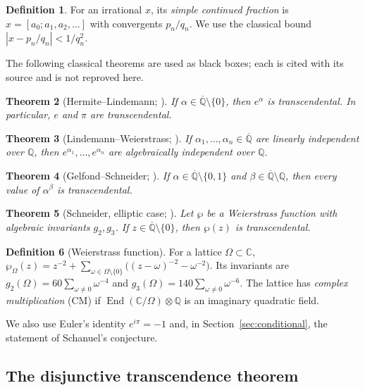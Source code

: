 \documentclass[11pt]{amsart}
\newtheorem{theorem}{Theorem}[section]
\theoremstyle{definition}
\newtheorem{definition}[theorem]{Definition}
\theoremstyle{remark}
\numberwithin{equation}{section}
\newcommand{\Q}{\mathbb{Q}}
\newcommand{\C}{\mathbb{C}}
\newcommand{\Qbar}{\overline{\mathbb{Q}}}
\newcommand{\ee}{e}
\begin{document}
\begin{definition}
For an irrational $x$, its \emph{simple continued fraction} is $x=[a_0;a_1,a_2,\dots]$ with convergents $p_n/q_n$. We use the classical bound $|x-p_n/q_n|<1/q_n^2$.
\end{definition}

The following classical theorems are used as black boxes; each is cited with its source and is not reproved here.

\begin{theorem}[Hermite--Lindemann; {\cite{Hermite1873,Lindemann1882}}]\label{thm:HL}
If $\alpha\in\Qbar\setminus\{0\}$, then $\ee^\alpha$ is transcendental. In particular, $\ee$ and $\pi$ are transcendental.
\end{theorem}

\begin{theorem}[Lindemann--Weierstrass; {\cite{Lindemann1882}}]\label{thm:LW}
If $\alpha_1,\dots,\alpha_n\in\Qbar$ are linearly independent over $\Q$, then $\ee^{\alpha_1},\dots,\ee^{\alpha_n}$ are algebraically independent over $\Q$.
\end{theorem}

\begin{theorem}[Gelfond--Schneider; {\cite{GS1934}}]\label{thm:GS}
If $\alpha\in\Qbar\setminus\{0,1\}$ and $\beta\in\Qbar\setminus\Q$, then every value of $\alpha^\beta$ is transcendental.
\end{theorem}

\begin{theorem}[Schneider, elliptic case; {\cite{Duke}}]\label{thm:schneider}
Let $\wp$ be a Weierstrass function with algebraic invariants $g_2,g_3$. If $z\in\Qbar\setminus\{0\}$, then $\wp(z)$ is transcendental.
\end{theorem}

\begin{definition}[Weierstrass function]
For a lattice $\Omega\subset\C$, $\wp_\Omega(z)=z^{-2}+\sum_{\omega\in\Omega\setminus\{0\}}\bigl((z-\omega)^{-2}-\omega^{-2}\bigr)$. Its invariants are $g_2(\Omega)=60\sum_{\omega\ne0}\omega^{-4}$ and $g_3(\Omega)=140\sum_{\omega\ne0}\omega^{-6}$. The lattice has \emph{complex multiplication} (CM) if $\operatorname{End}(\C/\Omega)\otimes\Q$ is an imaginary quadratic field.
\end{definition}

We also use Euler's identity $\ee^{i\pi}=-1$ and, in Section~\ref{sec:conditional}, the statement of Schanuel's conjecture.


\subsection{The disjunctive transcendence theorem}\label{sec:unconditional}
\end{document}
